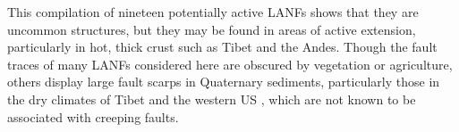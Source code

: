 \documentclass[twocolumn,grl]{AGUTeX}
\begin{document}
\begin{article}
This compilation of nineteen potentially active LANFs shows that they are uncommon structures, but they may be found in areas of active extension, particularly in hot, thick crust such as Tibet and the Andes. 
Though the fault traces of many LANFs considered here are obscured by vegetation or agriculture, others display large fault scarps in Quaternary sediments, particularly those in the dry climates of Tibet \citep[e.g.,][]{styron2013slr, kapp2005nqtl} and the western US \citep[e.g.,][]{axen1999baja, heyman2003dv}, which are not known to be associated with creeping faults.










\end{article}





%
%
\end{document}

